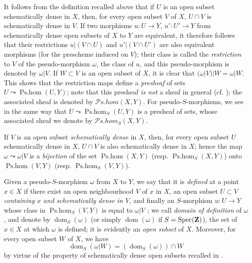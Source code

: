 \begin{env}[20.2.2]\label{IV.20.2.2}
It follows from the definition recalled above that if $U$ is an open subset schematically dense in $X$, then, for every open subset $V$ of $X$, $U\cap V$ is schematically dense in $V$.
If two morphisms $u:U\to Y$, $u':U'\to Y$ from schematically dense open subsets of $X$ to $Y$ are equivalent, it therefore follows that their restrictions $u|(V\cap U)$ and $u'|(V\cap U')$ are also equivalent morphisms (for the prescheme induced on $V$); their class is called the \emph{restriction} to $V$ of the pseudo-morphism $\omega$, the class of $u$, and this pseudo-morphism is denoted by $\omega|V$.
If $W\subset V$ is an open subset of $X$, it is clear that $(\omega|V)|W=\omega|W$.
This shows that the restriction maps define a \emph{presheaf} of sets $U\leadsto\operatorname{Ps.hom}(U,Y)$; note that this presheaf \emph{is not} a sheaf in general (cf. ); the associated sheaf is denoted by $\mathscr{P}\!s.\!\mathit{hom}(X,Y)$.
For pseudo-$S$-morphisms, we see in the same way that $U\leadsto\operatorname{Ps.hom}_S(U,Y)$ is a presheaf of sets, whose associated sheaf we denote by $\mathscr{P}\!s.\!\mathit{hom}_S(X,Y)$.

If $V$ is an open subset \emph{schematically dense} in $X$, then, for every open subset $U$ schematically dense in $X$, $U\cap V$ is also schematically dense in $X$; hence the map $\omega\leadsto\omega|V$ is a \emph{bijection} of the set $\operatorname{Ps.hom}(X,Y)$ (resp. $\operatorname{Ps.hom}_S(X,Y)$) onto $\operatorname{Ps.hom}(V,Y)$ (resp. $\operatorname{Ps.hom}_S(V,Y)$).
\end{env}

\begin{env}[20.2.3]\label{IV.20.2.3}
Given a pseudo-$S$-morphism $\omega$ from $X$ to $Y$, we say that it is \emph{defined} at a point $x\in X$ if there exist an open neighbourhood $V$ of $x$ in $X$, an open subset $U\subset V$ \emph{containing $x$ and schematically dense in $V$}, and finally an $S$-morphism $u:U\to Y$ whose class in $\operatorname{Ps.hom}_S(V,Y)$ is equal to $\omega|V$ ; we call \emph{domain of definition} of $\omega$, and denote by $\operatorname{dom}_S(\omega)$ (or simply $\operatorname{dom}(\omega)$ if $S=\operatorname{Spec}(\mathbf{Z})$), the set of $x\in X$ at which $\omega$ is defined; it is evidently an \emph{open subset} of $X$.
Moreover, for every open subset $W$ of $X$, we have
\[
\label{IV.20.2.3.1}
  \operatorname{dom}_S(\omega|W)=(\operatorname{dom}_S(\omega))\cap W
  \tag{20.2.3.1}
\]
by virtue of the property of schematically dense open subsets recalled in .
\end{env}

